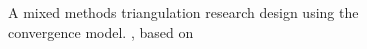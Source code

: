 \begin{figure} 
\small
{}
 
 
 
 
 
 


\caption{\label{fig:key:1.1} A mixed methods triangulation research design using the convergence model.
, based on \citealt{CreswellPlanoClark2007}
}
\end{figure}



